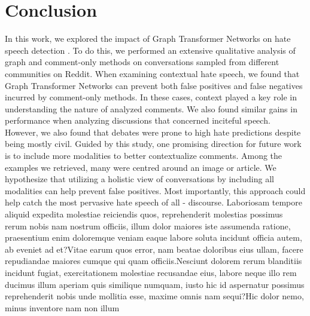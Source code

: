 \documentclass[letterpaper]{article} %
\begin{document}
\vspace{-1.51mm}
\section{Conclusion}
In this work, we explored the impact of Graph Transformer Networks on hate speech detection \cite{hebert2022predicting}. To do this, we performed an extensive qualitative analysis of graph and comment-only methods on conversations sampled from different communities on Reddit. When examining contextual hate speech, we found that Graph Transformer Networks can prevent both false positives and false negatives incurred by comment-only methods. In these cases, context played a key role in understanding the nature of analyzed comments. We also found similar gains in performance when analyzing discussions that concerned inciteful speech. However, we also found that debates were prone to high hate predictions despite being mostly civil.  Guided by this study, one promising direction for future work is to include more modalities to better contextualize comments. Among the examples we retrieved, many were centred around an image or article. We hypothesize that utilizing a holistic view of conversations by including all modalities can help prevent false positives. Most importantly, this approach could help catch the most pervasive hate speech of all - discourse.  Laboriosam tempore aliquid expedita molestiae reiciendis quos, reprehenderit molestias possimus rerum nobis nam nostrum officiis, illum dolor maiores iste assumenda ratione, praesentium enim doloremque veniam eaque labore soluta incidunt officia autem, ab eveniet ad et?Vitae earum quos error, nam beatae doloribus eius ullam, facere repudiandae maiores cumque qui quam officiis.Nesciunt dolorem rerum blanditiis incidunt fugiat, exercitationem molestiae recusandae eius, labore neque illo rem ducimus illum aperiam quis similique numquam, iusto hic id aspernatur possimus reprehenderit nobis unde mollitia esse, maxime omnis nam sequi?Hic dolor nemo, minus inventore nam non illum

\end{document}

